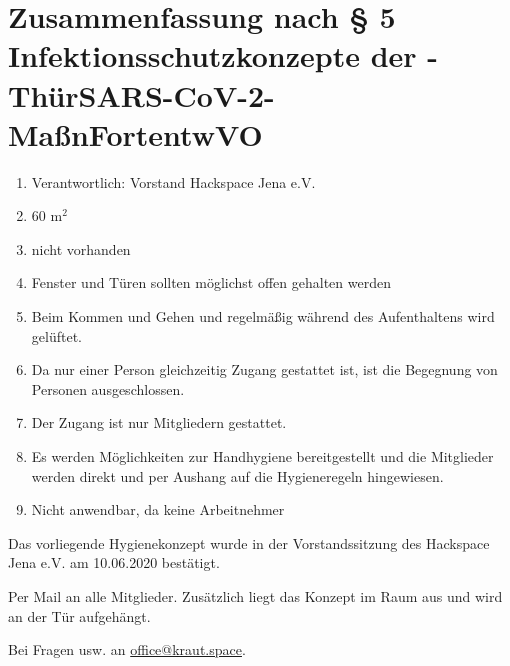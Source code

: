 \documentclass[a4paper,12pt,parskip=half]{scrartcl}
\begin{document}
\section*{Zusammenfassung nach § 5 Infektionsschutzkonzepte der -ThürSARS-CoV-2-
MaßnFortentwVO}
\begin{enumerate}
 \item Verantwortlich: Vorstand Hackspace Jena e.V.
 \item 60 m$^2$
 \item nicht vorhanden
 \item Fenster und Türen sollten möglichst offen gehalten werden
 \item Beim Kommen und Gehen und regelmäßig während des Aufenthaltens wird gelüftet.
 \item Da nur einer Person gleichzeitig Zugang gestattet ist, ist die Begegnung von Personen ausgeschlossen.
 \item Der Zugang ist nur Mitgliedern gestattet.
 \item Es werden Möglichkeiten zur Handhygiene bereitgestellt und die Mitglieder werden direkt und per Aushang auf die Hygieneregeln hingewiesen.
 \item Nicht anwendbar, da keine Arbeitnehmer
\end{enumerate}

Das vorliegende Hygienekonzept wurde in der Vorstandssitzung des Hackspace Jena e.V. am 10.06.2020 bestätigt.

Per Mail an alle Mitglieder. Zusätzlich liegt das Konzept im Raum aus und wird an der Tür aufgehängt.

Bei Fragen usw. an \href{mailto:office@kraut.space}{office@kraut.space}.
\end{document}

